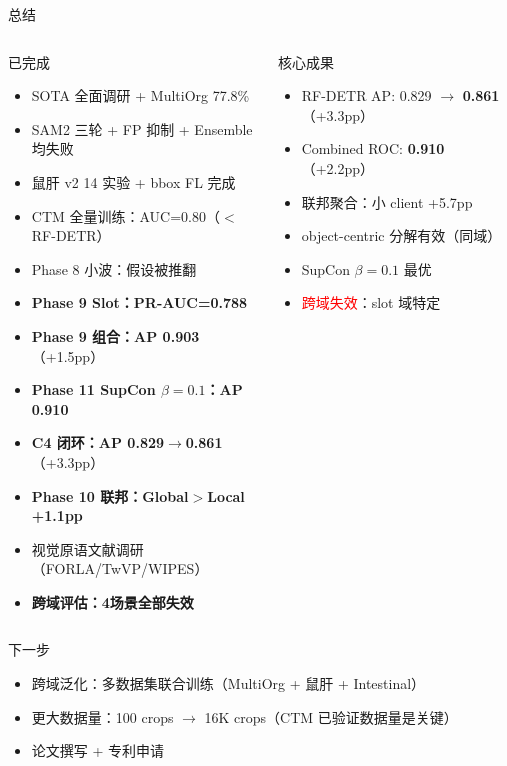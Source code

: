 \documentclass[aspectratio=169, 10pt]{beamer}
\begin{document}
\begin{frame}{总结}
  \begin{columns}[T]
    \begin{block}{已完成}
      \begin{itemize}
        \item[\checkmark] SOTA 全面调研 + MultiOrg 77.8\%
        \item[\checkmark] SAM2 三轮 + FP 抑制 + Ensemble 均失败
        \item[\checkmark] 鼠肝 v2 14 实验 + bbox FL 完成
        \item[\checkmark] CTM 全量训练：AUC=0.80（$<$RF-DETR）
        \item[\checkmark] Phase 8 小波：假设被推翻
        \item[\checkmark] \textbf{Phase 9 Slot：PR-AUC=0.788}
        \item[\checkmark] \textbf{Phase 9 组合：AP 0.903}（+1.5pp）
        \item[\checkmark] \textbf{Phase 11 SupCon $\beta=0.1$：AP 0.910}
        \item[\checkmark] \textbf{C4 闭环：AP 0.829$\to$0.861}（+3.3pp）
        \item[\checkmark] \textbf{Phase 10 联邦：Global$>$Local +1.1pp}
        \item[\checkmark] 视觉原语文献调研（FORLA/TwVP/WIPES）
        \item[\checkmark] \textbf{跨域评估：4场景全部失效}
      \end{itemize}
    \end{block}
    \begin{alertblock}{核心成果}
      \begin{itemize}
        \item RF-DETR AP: 0.829 $\to$ \textbf{0.861}（+3.3pp）
        \item Combined ROC: \textbf{0.910}（+2.2pp）
        \item 联邦聚合：小 client +5.7pp
        \item object-centric 分解有效（同域）
        \item SupCon $\beta=0.1$ 最优
        \item \textcolor{red}{跨域失效}：slot 域特定
      \end{itemize}
    \end{alertblock}
  \end{columns}
  \vspace{0em}
  \begin{alertblock}{下一步}
    \begin{itemize}
      \item 跨域泛化：多数据集联合训练（MultiOrg + 鼠肝 + Intestinal）
      \item 更大数据量：100 crops $\to$ 16K crops（CTM 已验证数据量是关键）
      \item 论文撰写 + 专利申请
    \end{itemize}
  \end{alertblock}
\end{frame}
\end{document}
